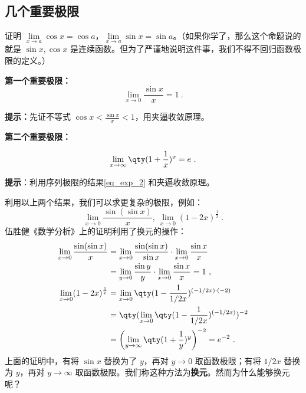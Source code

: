 \subsection{几个重要极限}
\begin{exercise}{}
证明 $\lim\limits_{x\rightarrow a}\cos x=\cos a$，$\lim\limits_{x\rightarrow a}\sin x=\sin a$。（如果你学了，那么这个命题说的就是 $\sin x,\cos x$ 是连续函数。但为了严谨地说明这件事，我们不得不回归函数极限的定义。）
\end{exercise}

\textbf{第一个重要极限：}
\begin{equation}
\lim\limits_{x\rightarrow 0}\frac{\sin x}{x}=1~.
\end{equation}

\textbf{提示：}先证不等式 $\cos x<\frac{\sin x}{x}<1$，用夹逼收敛原理。

\textbf{第二个重要极限：}

\begin{equation}
\lim\limits_{x\rightarrow \infty} \qty(1+\frac{1}{x})^x=e~.
\end{equation}

\textbf{提示}：利用序列极限的结果\autoref{eq_exp_2} 和夹逼收敛原理。

利用以上两个结果，我们可以求更复杂的极限，例如：
\begin{equation}
\lim\limits_{x\rightarrow 0}\frac{\sin(\sin x)}{x},\ \lim\limits_{x\rightarrow 0}(1-2x)^{\frac{1}{x}}~.
\end{equation}
伍胜健《数学分析》上的证明利用了换元的操作：
\begin{equation}
\begin{aligned}
\lim\limits_{x\rightarrow 0}\frac{\sin(\sin x)}{x}&=\lim\limits_{x\rightarrow 0}\frac{\sin(\sin x)}{\sin x}\cdot \lim\limits_{x\rightarrow 0}\frac{\sin x}{x}\\
&=\lim\limits_{y\rightarrow 0}\frac{\sin y}{y}\cdot \lim\limits_{x\rightarrow 0}\frac{\sin x}{x}=1~,\\
\lim\limits_{x\rightarrow 0}(1-2x)^{\frac{1}{x}}&=\lim\limits_{x\rightarrow 0}\qty(1-\frac{1}{1/2x})^{(-1/2x)\cdot (-2)}\\&=\qty(\lim\limits_{x\rightarrow 0}\qty(1-\frac{1}{1/2x})^{(-1/2x)})^{-2}
\\&=\left(\lim\limits_{y\rightarrow \infty}\qty(1+\frac{1}{y})^{y}\right)^{-2}=e^{-2}~.
\end{aligned}
\end{equation}
上面的证明中，有将 $\sin x$ 替换为了 $y$，再对 $y\rightarrow 0$ 取函数极限；有将 $1/2x$ 替换为 $y$，再对 $y\rightarrow \infty$ 取函数极限。我们称这种方法为\textbf{换元}。然而为什么能够换元呢？

